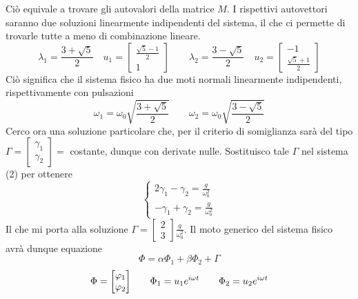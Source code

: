 \documentclass{scrartcl}
\renewcommand{\phi}{\varphi}
\begin{document}
    Ciò equivale a trovare gli autovalori della matrice \(M\). I rispettivi autovettori saranno due soluzioni linearmente indipendenti del sistema, il che ci permette di trovarle tutte a meno di combinazione lineare.
    \begin{equation}
        \lambda_1 = \frac{3+\sqrt{5}}{2} \quad u_1 = \begin{bmatrix} \frac{\sqrt{5}-1}{2} \\ 1 \end{bmatrix} \qquad \lambda_2 = \frac{3-\sqrt{5}}{2} \quad u_2 = \begin{bmatrix} -1 \\ \frac{\sqrt{5}+1}{2} \end{bmatrix}
    \end{equation}
    Ciò significa che il sistema fisico ha due moti normali linearmente indipendenti, rispettivamente con pulsazioni
    \[\omega_1 = \omega_0 \sqrt{\frac{3+\sqrt{5}}{2}} \qquad \omega_2 = \omega_0 \sqrt{\frac{3-\sqrt{5}}{2}}\]
    Cerco ora una soluzione particolare che, per il criterio di somiglianza sarà del tipo \(\Gamma = \begin{bmatrix}\gamma_1 \\ \gamma_2\end{bmatrix} = \) costante, dunque con derivate nulle. Sostituisco tale \(\Gamma\) nel sistema (2) per ottenere
    \begin{equation}
        \begin{cases}
            2 \gamma_1 -\gamma_2 = \frac{g}{\omega_0^2} \\
            - \gamma_1 + \gamma_2 = \frac{g}{\omega_0^2}
        \end{cases}
    \end{equation}
    Il che mi porta alla soluzione \(\Gamma = \begin{bmatrix}2 \\ 3\end{bmatrix} \frac{g}{\omega_0^2}\).
    Il moto generico del sistema fisico avrà dunque equazione
    \begin{equation}
        \Phi = \alpha \Phi_1 + \beta \Phi_2 + \Gamma 
    \end{equation}
    \[\Phi = \mqty[\phi_1 \\ \phi_2] \qquad \Phi_1 = u_1 e^{i \omega t} \qquad \Phi_2 = u_2 e^{i \omega t}\]
\end{document}
